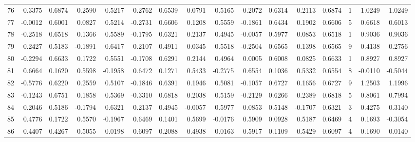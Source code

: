 \begin{tabular}{lrrrrrrrrrrrrrrr}
76  &     -0.3375 &  0.6874 &  0.2590 &  0.5217 & -0.2762 &  0.6539 &  0.0791 &  0.5165 & -0.2072 &  0.6314 &   0.2113 &     0.6874 &      1 &                    1.0249 &                     1.0249 \\
77  &     -0.0012 &  0.6001 &  0.0827 &  0.5214 & -0.2731 &  0.6606 &  0.1208 &  0.5559 & -0.1861 &  0.6434 &   0.1902 &     0.6606 &      5 &                    0.6618 &                     0.6013 \\
78  &     -0.2518 &  0.6518 &  0.1366 &  0.5589 & -0.1795 &  0.6321 &  0.2137 &  0.4945 & -0.0057 &  0.5977 &   0.0853 &     0.6518 &      1 &                    0.9036 &                     0.9036 \\
79  &      0.2427 &  0.5183 & -0.1891 &  0.6417 &  0.2107 &  0.4911 &  0.0345 &  0.5518 & -0.2504 &  0.6565 &   0.1398 &     0.6565 &      9 &                    0.4138 &                     0.2756 \\
80  &     -0.2294 &  0.6633 &  0.1722 &  0.5551 & -0.1708 &  0.6291 &  0.2144 &  0.4964 &  0.0005 &  0.6008 &   0.0825 &     0.6633 &      1 &                    0.8927 &                     0.8927 \\
81  &      0.6664 &  0.1620 &  0.5598 & -0.1958 &  0.6472 &  0.1271 &  0.5433 & -0.2775 &  0.6554 &  0.1036 &   0.5332 &     0.6554 &      8 &                   -0.0110 &                    -0.5044 \\
82  &     -0.5776 &  0.6220 &  0.2559 &  0.5107 & -0.1846 &  0.6391 &  0.1946 &  0.5081 & -0.1057 &  0.6727 &   0.1656 &     0.6727 &      9 &                    1.2503 &                     1.1996 \\
83  &     -0.1243 &  0.6751 &  0.1858 &  0.5369 & -0.3310 &  0.6818 &  0.2038 &  0.5159 & -0.2129 &  0.6266 &   0.2389 &     0.6818 &      5 &                    0.8061 &                     0.7994 \\
84  &      0.2046 &  0.5186 & -0.1794 &  0.6321 &  0.2137 &  0.4945 & -0.0057 &  0.5977 &  0.0853 &  0.5148 &  -0.1707 &     0.6321 &      3 &                    0.4275 &                     0.3140 \\
85  &      0.4776 &  0.1722 &  0.5570 & -0.1967 &  0.6469 &  0.1401 &  0.5699 & -0.0176 &  0.5909 &  0.0928 &   0.5187 &     0.6469 &      4 &                    0.1693 &                    -0.3054 \\
86  &      0.4407 &  0.4267 &  0.5055 & -0.0198 &  0.6097 &  0.2088 &  0.4938 & -0.0163 &  0.5917 &  0.1109 &   0.5429 &     0.6097 &      4 &                    0.1690 &                    -0.0140 \\

\end{tabular}
